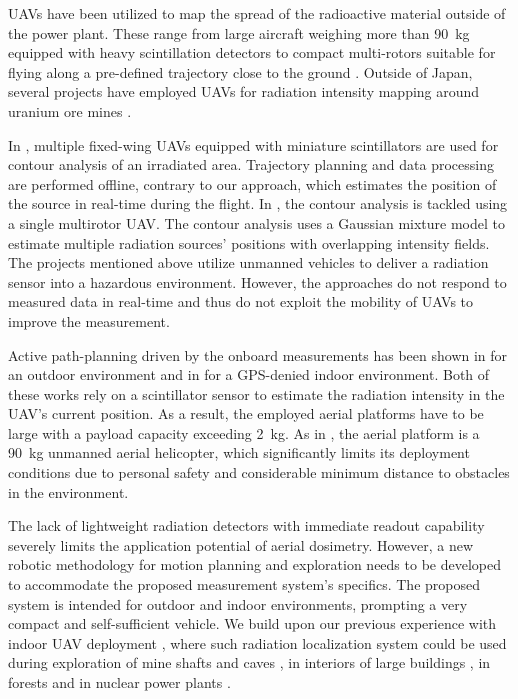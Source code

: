 \documentclass[a4paper,11pt,titlepage,twoside]{book}
\begin{document}
\acp{UAV} have been utilized to map the spread of the radioactive material outside of the power plant.
These range from large aircraft weighing more than \SI{90}{\kilogram} equipped with heavy scintillation detectors \cite{sanada2015aerial, towler2012radiation, jiang2016prototype}
to compact multi-rotors suitable for flying along a pre-defined trajectory close to the ground \cite{macfarlane2014lightweight, christie2017radiation, martin20163d}.
Outside of Japan, several projects have employed \acp{UAV} for radiation intensity mapping around uranium ore mines \cite{salek2018mapping, keatley2018source, martin2015use}.

In \cite{han2013lowcost}, multiple fixed-wing \acp{UAV} equipped with miniature scintillators are used for contour analysis of an irradiated area.
Trajectory planning and data processing are performed offline, contrary to our approach, which estimates the position of the source in real-time during the flight.
In \cite{newaz2016uav}, the contour analysis is tackled using a single multirotor \ac{UAV}. The contour analysis uses a Gaussian mixture model to estimate multiple radiation sources' positions with overlapping intensity fields.
The projects mentioned above utilize unmanned vehicles to deliver a radiation sensor into a hazardous environment.
However, the approaches do not respond to measured data in real-time and thus do not exploit the mobility of \acp{UAV} to improve the measurement.

Active path-planning driven by the onboard measurements has been shown in \cite{towler2012radiation} for an outdoor environment and in \cite{mascarich2018radiation} for a GPS-denied indoor environment.
Both of these works rely on a scintillator sensor to estimate the radiation intensity in the \ac{UAV}'s current position.
As a result, the employed aerial platforms have to be large with a payload capacity exceeding \SI{2}{\kilogram}.
As in \cite{towler2012radiation}, the aerial platform is a \SI{90}{\kilogram} unmanned aerial helicopter, which significantly limits its deployment conditions due to personal safety and considerable minimum distance to obstacles in the environment.

The lack of lightweight radiation detectors with immediate readout capability severely limits the application potential of aerial dosimetry.
However, a new robotic methodology for motion planning and exploration needs to be developed to accommodate the proposed measurement system's specifics.
The proposed system is intended for outdoor and indoor environments, prompting a very compact and self-sufficient vehicle.
We build upon our previous experience with indoor \ac{UAV} deployment \cite{baca2020mrs}, where such radiation localization system could be used during exploration of mine shafts and caves \cite{roucek2019darpa, petrlik2020robust}, in interiors of large buildings \cite{kratky2020autonomous, saska2020formation}, in forests \cite{petracek2020bioinspired} and in nuclear power plants \cite{kratky2020autonomous2}.
\end{document}
